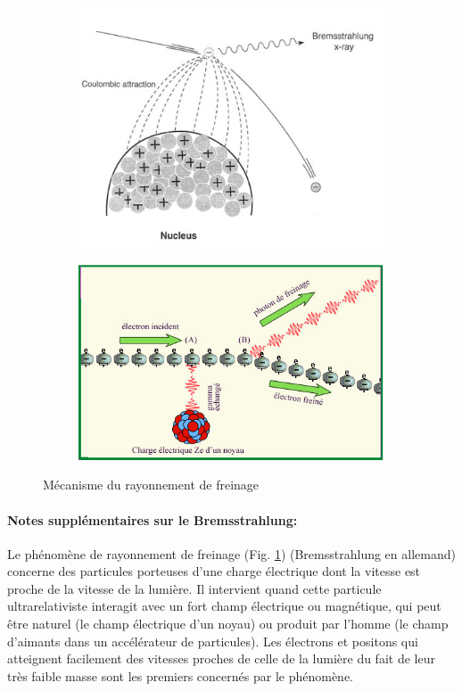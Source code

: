 \begin{figure}[ht]
    \centering
    \begin{subfigure}{.5\textwidth}
        \raggedright
        \includegraphics[width=.9\linewidth]{Images1/Bremsstrahlung2.PNG}
    \end{subfigure}%
    \begin{subfigure}{.5\textwidth}
        \raggedleft
        \includegraphics[width=.9\linewidth]{Images1/Bremsstrahlung3.PNG}
    \end{subfigure}
    \caption{Mécanisme du rayonnement de freinage}
    \label{fig:rayonnement_freinage}
\end{figure}

\paragraph{Notes supplémentaires sur le Bremsstrahlung:} Le phénomène de rayonnement de freinage (Fig. \ref{fig:rayonnement_freinage}) (Bremsstrahlung en allemand) concerne des particules porteuses d’une charge électrique dont la vitesse est proche de la vitesse de la lumière. Il intervient quand cette particule ultrarelativiste interagit avec un fort champ électrique ou magnétique, qui peut être naturel (le champ électrique d’un noyau) ou produit par l’homme (le champ d’aimants dans un accélérateur de particules). Les électrons et positons qui atteignent facilement des vitesses proches de celle de la lumière du fait de leur très faible masse sont les premiers concernés par le phénomène. \\

